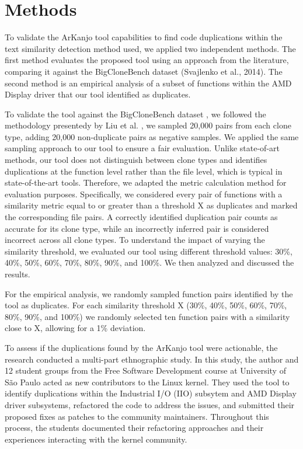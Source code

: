 \documentclass[conference]{IEEEtran}
\begin{document}
\section{Methods}

To validate the ArKanjo tool capabilities to find code duplications within the 
text similarity detection method used, we applied two independent
methods. The first method evaluates the proposed tool using an approach from the literature,
comparing it against the BigCloneBench dataset (Svajlenko et al., 2014). The second
method is an empirical analysis of a subset of functions within the AMD Display driver
that our tool identified as duplicates. 

To validate the tool against the BigCloneBench dataset \cite{bigclonebench}, we followed
the methodology presentedy by Liu et al. \cite{tailor}, we sampled 20,000 pairs from each clone
type, adding 20,000 non-duplicate pairs as negative samples. We applied the same sampling
approach to our tool to ensure a fair evaluation.
Unlike state-of-art methods, our tool does not distinguish between clone types and
identifies duplications at the function level rather than the file level, which is typical in
state-of-the-art tools. Therefore, we adapted the metric calculation method for evaluation
purposes. Specifically, we considered every pair of functions with a similarity metric
equal to or greater than a threshold X as duplicates and marked the corresponding file
pairs. A correctly identified duplication pair counts as accurate for its clone type, while
an incorrectly inferred pair is considered incorrect across all clone types.
To understand the impact of varying the similarity threshold, we evaluated our tool using
different threshold values: 30\%, 40\%, 50\%, 60\%, 70\%, 80\%, 90\%, and 100\%. We then analyzed
and discussed the results.

For the empirical analysis, we randomly sampled function pairs identified by the tool as
duplicates. For each similarity threshold X (30\%, 40\%, 50\%, 60\%, 70\%, 80\%, 90\%, and 100\%) 
we randomly selected ten function pairs with a similarity close to X, allowing for a 1\%
deviation.

To assess if the duplications found by the ArKanjo tool were actionable, the research conducted 
a multi-part ethnographic study. In this study, the author and 12 student groups from the
Free Software Development course at University of São Paulo acted as new contributors 
to the Linux kernel. 
They used the tool to identify duplications within the Industrial I/O (IIO) subsytem and AMD Display 
driver subsystems, refactored the code to address the issues, and submitted their proposed 
fixes as patches to the community maintainers. Throughout this process, the students documented 
their refactoring approaches and their experiences interacting with the kernel community.
\end{document}
